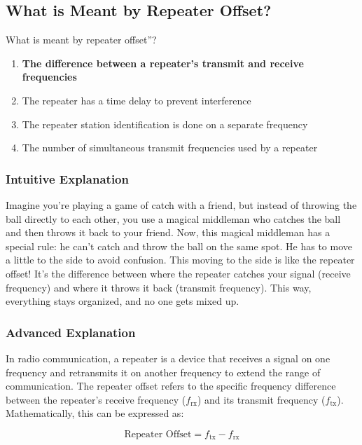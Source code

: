 \subsection{What is Meant by Repeater Offset?}
\label{T2A07}

\begin{tcolorbox}[colback=gray!10!white,colframe=black!75!black,title=T2A07]
What is meant by repeater offset”?  
\begin{enumerate}[label=\Alph*.]  
    \item \textbf{The difference between a repeater’s transmit and receive frequencies}  
    \item The repeater has a time delay to prevent interference  
    \item The repeater station identification is done on a separate frequency  
    \item The number of simultaneous transmit frequencies used by a repeater  
\end{enumerate}  
\end{tcolorbox}

\subsubsection{Intuitive Explanation}  
Imagine you’re playing a game of catch with a friend, but instead of throwing the ball directly to each other, you use a magical middleman who catches the ball and then throws it back to your friend. Now, this magical middleman has a special rule: he can’t catch and throw the ball on the same spot. He has to move a little to the side to avoid confusion. This moving to the side is like the repeater offset! It’s the difference between where the repeater catches your signal (receive frequency) and where it throws it back (transmit frequency). This way, everything stays organized, and no one gets mixed up.

\subsubsection{Advanced Explanation}  
In radio communication, a repeater is a device that receives a signal on one frequency and retransmits it on another frequency to extend the range of communication. The repeater offset refers to the specific frequency difference between the repeater’s receive frequency (\(f_{\text{rx}}\)) and its transmit frequency (\(f_{\text{tx}}\)). Mathematically, this can be expressed as:  

\[
\text{Repeater Offset} = f_{\text{tx}} - f_{\text{rx}}
\]

